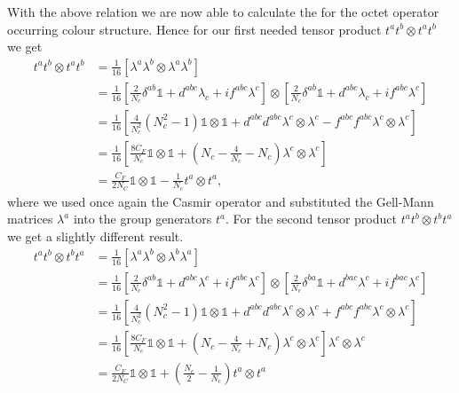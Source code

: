	With the above relation we are now able to calculate the for the octet operator occurring colour structure. Hence for our first needed tensor product $t^at^b\otimes t^at^b$ we get 
	\begin{equation}
                \begin{split}
			\label{eq:tatbotimestatb}
                        t^a t^b \otimes t^a t^b &= \frac{1}{16} [\lambda^a \lambda^b \otimes \lambda^a \lambda^b] \\
                        &= \frac{1}{16} \left[\frac{2}{N_c}\delta^{ab} \mathbb{1} + d^{abc} \lambda_c + if^{abc} \lambda^c\right] \otimes \left[\frac{2}{N_c}\delta^{ab} \mathbb{1} + d^{abc} \lambda_c + if^{abc} \lambda^c\right] \\
                        &= \frac{1}{16}\left[\frac{4}{N_c^2}(N_c^2-1)\mathbb{1}\otimes\mathbb{1} + d^{abc}d^{abc}\lambda^c\otimes\lambda^c - f^{abc}f^{abc} \lambda^c \otimes \lambda^c\right] \\
                        &= \frac{1}{16} \left[\frac{8C_F}{N_c} \mathbb{1}\otimes\mathbb{1} + \left(N_c - \frac{4}{N_c} - N_c \right) \lambda^c \otimes \lambda^c \right] \\
                        &= \frac{C_F}{2N_C}\mathbb{1}\otimes\mathbb{1} - \frac{1}{N_c}t^a \otimes t^a,
                \end{split}
        \end{equation}
        where we used once again the Casmir operator and substituted the Gell-Mann matrices $\lambda^a$ into the group generators $t^a$. For the second tensor product $t^at^b\otimes t^bt^a$ we get a slightly different result.
        \begin{equation}
                \label{eq:tatbotimestbta}
                \begin{split}
                        t^at^b \otimes t^b t^a &= \frac{1}{16} [\lambda^a \lambda^b \otimes \lambda^b \lambda^a] \\
                        &= \frac{1}{16} \left[ \frac{2}{N_c} \delta^{ab} \mathbb{1} + d^{abc} \lambda^c + if^{abc}\lambda^c \right ] \otimes \left[ \frac{2}{N_c} \delta^{ba} \mathbb{1} + d^{bac} \lambda^c + if^{bac} \lambda^c \right ] \\
                        &= \frac{1}{16} \left[ \frac{4}{N_c^2} (N_c^2 -1) \mathbb{1}\otimes\mathbb{1} + d^{abc}d^{abc} \lambda^c \otimes \lambda^c + f^{abc}f^{abc} \lambda^c \otimes \lambda^c\right ]  \\
                        &= \frac{1}{16} \left[ \frac{8C_F}{N_c} \mathbb{1} \otimes \mathbb{1} + \left(N_c- \frac{4}{N_c} + N_c \right) \lambda^c \otimes \lambda^c \right ] \lambda^c \otimes \lambda^c\\
                        &= \frac{C_F}{2N_C} \mathbb{1} \otimes \mathbb{1} + \left( \frac{N_c}{2} - \frac{1}{N_c}\right ) t^a \otimes t^a
                \end{split}
        \end{equation}
